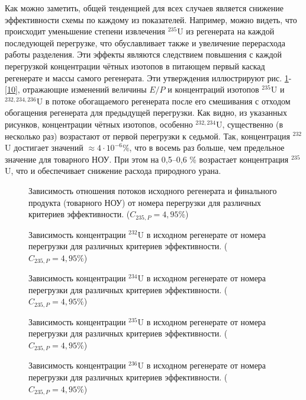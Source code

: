 Как можно заметить, общей тенденцией для всех случаев является снижение эффективности схемы по каждому из показателей. Например, можно видеть, что происходит уменьшение степени извлечения $^{235}$U из регенерата на каждой последующей перегрузке, что обуславливает также и увеличение перерасхода работы разделения. Эти эффекты являются следствием повышения с каждой перегрузкой концентрации чётных изотопов в питающем первый каскад регенерате и массы самого регенерата. Эти утверждения иллюстрируют рис. \ref{7}-\ref{10}, отражающие изменений величины $E/P$ и концентраций изотопов $^{235}$U и $^{232,234,236}$U в потоке обогащаемого регенерата после его смешивания с отходом обогащения регенерата для предыдущей перегрузки. Как видно, из указанных рисунков, концентрации чётных изотопов, особенно $^{232,234}$U, существенно (в несколько раз) возрастают от первой перегрузки к седьмой. Так, концентрация $^{232}$U достигает значений $\approx 4\cdot10^{-6} \%$, что в восемь раз больше, чем предельное значение для товарного НОУ. При этом на 0,5--0,6 \% возрастает концентрация $^{235}$U, что и обеспечивает снижение расхода природного урана.       

\begin{figure}[h]
    \centering
    
    \caption{Зависимость отношения потоков исходного регенерата и финального продукта (товарного НОУ) от номера перегрузки для различных критериев эффективности. ($C_{235,{P}}=4,95\%$)}\label{7}
\end{figure}

\begin{figure}[h]
    \centering
    \begin{minipage}{.5\textwidth}
      \centering
      
      \caption{{Зависимость концентрации $^{232}$U в исходном регенерате от номера перегрузки для различных критериев эффективности. ($C_{235,{P}}=4,95\%$){\label{8}}}}
    \end{minipage}%
    \begin{minipage}{.5\textwidth}
      \centering
      
\caption{{Зависимость концентрации $^{234}$U в исходном регенерате от номера перегрузки для различных критериев эффективности. ($C_{235,{P}}=4,95\%$){\label{9}}}}
\end{minipage}
\end{figure}

\begin{figure}[h]
    \centering
    \begin{minipage}{.5\textwidth}
      \centering
      
      \caption{{Зависимость концентрации $^{235}$U в исходном регенерате от номера перегрузки для различных критериев эффективности. ($C_{235,{P}}=4,95\%$){\label{10}}}}
    \end{minipage}%
    \begin{minipage}{.5\textwidth}
      \centering
      
\caption{{Зависимость концентрации $^{236}$U в исходном регенерате от номера перегрузки для различных критериев эффективности. ($C_{235,{P}}=4,95\%$){\label{11}}}}
\end{minipage}
\end{figure}

